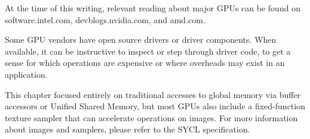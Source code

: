 At the time of this writing, relevant reading about major GPUs can be found on software.intel.com, devblogs.nvidia.com, and amd.com.\par

Some GPU vendors have open source drivers or driver components. When available, it can be instructive to inspect or step through driver code, to get a sense for which operations are expensive or where overheads may exist in an application.\par

This chapter focused entirely on traditional accesses to global memory via buffer accessors or Unified Shared Memory, but most GPUs also include a fixed-function texture sampler that can accelerate operations on images. For more information about images and samplers, please refer to the SYCL specification.\par



\newpage